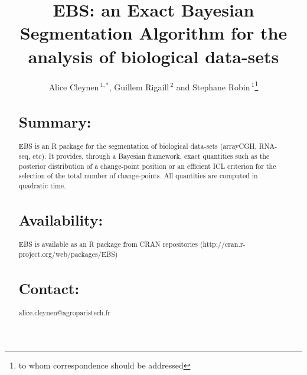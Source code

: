 \documentclass{bioinfo}
\begin{document}

\title[short Title]{EBS: an Exact Bayesian Segmentation Algorithm for the analysis of biological data-sets}
\author[Sample \textit{et~al}]{Alice Cleynen\,$^{1,*}$, Guillem Rigaill\,$^{2}$ and Stephane Robin\,$^1$\footnote{to whom correspondence should be addressed}}
\address{$^{1}$AgroParisTech,
16 rue Claude Bernard, 75231 Paris Cedex 05, France \\
$^{2}$Department of XXXXXXXX, Address XXXX etc.}



\maketitle


\begin{abstract}

\section{Summary:}
 EBS is an R package for the segmentation of biological data-sets (arrayCGH, RNA-seq, etc). It provides, through a Bayesian framework, exact quantities such as the posterior distribution of a change-point position or an efficient ICL criterion for the selection of the total number of change-points. All quantities are computed in quadratic time.


\section{Availability:}
EBS is available as an R package from CRAN repositories (http://cran.r-project.org/web/packages/EBS)


\section{Contact:} alice.cleynen@agroparistech.fr
\end{abstract}
\end{document}
